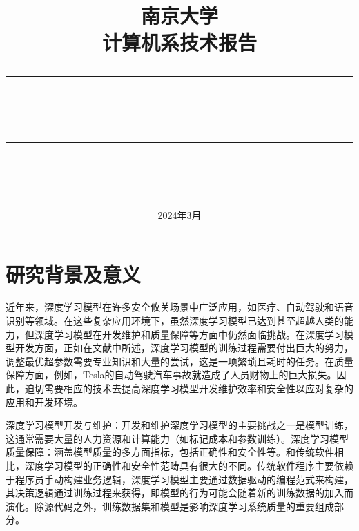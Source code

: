 \documentclass[fontset=macnew,UTF8]{article} %
\newcommand{\horrule}[1]{\rule[0.5ex]{\linewidth}{#1}} 	%
\begin{document}
\title{
{\textsc{
南京大学\\
计算机系技术报告 \\[150pt]}}
\horrule{2.5pt}\\
\horrule{1.8pt}\\[150pt]
}
\date{2024年3月} %

\begin{titlepage}
\maketitle
\vspace{30pt}
\thispagestyle{empty}
\end{titlepage}

\tableofcontents
\thispagestyle{empty}

\newpage
\setcounter{page}{1}

\section{研究背景及意义}
近年来，深度学习模型在许多安全攸关场景中广泛应用，如医疗\cite{medical}、自动驾驶\cite{self_Driving}和语音识别\cite{speech_recognition}等领域。在这些复杂应用环境下，虽然深度学习模型已达到甚至超越人类的能力，但深度学习模型在开发维护\cite{menghani2023efficient}和质量保障\cite{chakraborty2019software}等方面中仍然面临挑战。在深度学习模型开发方面，正如在文献\cite{mohammed2023comprehensive}中所述，深度学习模型的训练过程需要付出巨大的努力，调整最优超参数需要专业知识和大量的尝试，这是一项繁琐且耗时的任务。在质量保障方面，例如，Tesla的自动驾驶汽车事故就造成了人员财物上的巨大损失\cite{Tesla}。因此，迫切需要相应的技术去提高深度学习模型开发维护效率和安全性以应对复杂的应用和开发环境。

深度学习模型开发与维护：开发和维护深度学习模型的主要挑战之一是模型训练，这通常需要大量的人力资源和计算能力（如标记成本和参数训练）。深度学习模型质量保障：涵盖模型质量的多方面指标，包括正确性和安全性等\cite{landscapes}。和传统软件相比，深度学习模型的正确性和安全性范畴具有很大的不同。传统软件程序主要依赖于程序员手动构建业务逻辑，深度学习模型主要通过数据驱动的编程范式来构建，其决策逻辑通过训练过程来获得，即模型的行为可能会随着新的训练数据的加入而演化\cite{amershi2019software}。除源代码之外，训练数据集和模型是影响深度学习系统质量的重要组成部分。
\end{document}
